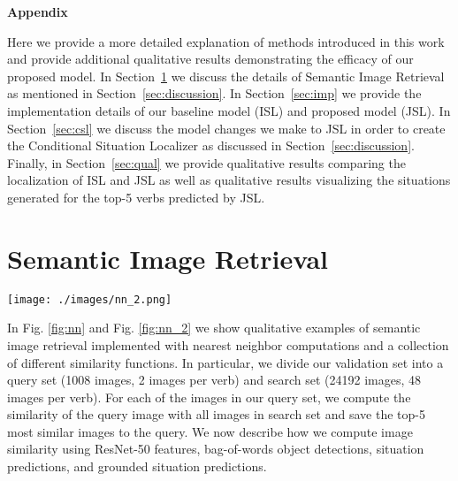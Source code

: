 \documentclass[runningheads]{llncs}
\begin{document}
 \pagebreak


\clearpage
\pagebreak
\appendix

\begin{center}

\begin{Large}
\textbf{Appendix}
\end{Large} 

\end{center}

\noindent Here we provide a more detailed explanation of methods introduced in this work and provide additional qualitative results demonstrating the efficacy of our proposed model. In Section~\ref{sec:SIR} we discuss the details of Semantic Image Retrieval as mentioned in Section~\ref{sec:discussion}. In Section~\ref{sec:imp} we provide the implementation details of our baseline model (ISL) and proposed model (JSL). In Section~\ref{sec:csl} we discuss the model changes we make to JSL in order to create the Conditional Situation Localizer as discussed in Section~\ref{sec:discussion}. Finally, in Section~\ref{sec:qual} we provide qualitative results comparing the localization of ISL and JSL as well as qualitative results visualizing the situations generated for the top-5 verbs predicted by JSL.  

\section{Semantic Image Retrieval}
\label{sec:SIR}

\begin{figure*}
\centering
\texttt{[image: ./images/nn\_2.png]}
\caption{\textbf{Additional qualitative results for semantic image retrieval}. For the query figure of a baker kneading dough or multiple hikers walking, ResNet and Object Detection based methods struggle to match the semantics of the image. Grounded situation based retrieval leads to the correct semantics with matching viewpoints}

\label{fig:nn_2}
\end{figure*}


In Fig. \ref{fig:nn} and Fig. \ref{fig:nn_2} we show qualitative examples of semantic image retrieval implemented with nearest neighbor computations and a collection of different similarity functions. In particular, we divide our validation set into a query set (1008 images, 2 images per verb) and search set (24192 images, 48 images per verb). For each of the images in our query set, we compute the similarity of the query image with all images in search set and save the top-5 most similar images to the query. We now describe how we compute image similarity using ResNet-50 features, bag-of-words object detections, situation predictions, and grounded situation predictions.
\end{document}
